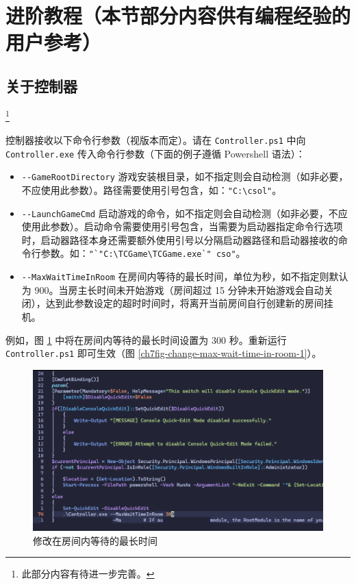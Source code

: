 \section{进阶教程（本节部分内容供有编程经验的用户参考）}
\label{section_advanced_usage}

\subsection{关于控制器}\footnote{此部分内容有待进一步完善。}

控制器接收以下命令行参数（视版本而定）。请在 \lstinline{Controller.ps1} 中向 \lstinline{Controller.exe} 传入命令行参数（下面的例子遵循 Powershell 语法）：

\begin{itemize}
\item \lstinline{--GameRootDirectory} 游戏安装根目录，如不指定则会自动检测（如非必要，不应使用此参数）。路径需要使用引号包含，如：\lstinline{"C:\csol"}。
\item \lstinline{--LaunchGameCmd} 启动游戏的命令，如不指定则会自动检测（如非必要，不应使用此参数）。启动命令需要使用引号包含，当需要为启动器指定命令行选项时，启动器路径本身还需要额外使用引号以分隔启动器路径和启动器接收的命令行参数。如：\lstinline{"`"C:\TCGame\TCGame.exe`" cso"}。
\item \lstinline{--MaxWaitTimeInRoom} 在房间内等待的最长时间，单位为秒，如不指定则默认为 900。当房主长时间未开始游戏（房间超过 15 分钟未开始游戏会自动关闭），达到此参数设定的超时时间时，将离开当前房间自行创建新的房间挂机。
\end{itemize}

例如，图 \ref{ch7fig-change-max-wait-time-in-room-0} 中将在房间内等待的最长时间设置为 300 秒。重新运行 \lstinline{Controller.ps1} 即可生效（图 \ref{ch7fig-change-max-wait-time-in-room-1}）。

\begin{figure}[H]
    \Centering
    \includegraphics[width=\textwidth]{documents/assets/advanced/change_max_wait_time_in_room_0.png}
    \caption{修改在房间内等待的最长时间}
    \label{ch7fig-change-max-wait-time-in-room-0}
\end{figure}

